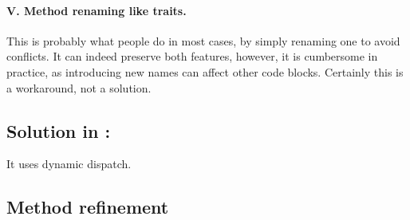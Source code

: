 \paragraph{V. Method renaming like traits.} This is probably what people do in most cases, by simply renaming one to avoid conflicts.
It can indeed preserve both features, however, it is cumbersome in practice, as introducing new names can affect other code blocks.
Certainly this is a workaround, not a solution.

\subsection{Solution in \MIM: \dispatchnamecaptical}
It uses dynamic dispatch.

\subsection{Method refinement}

